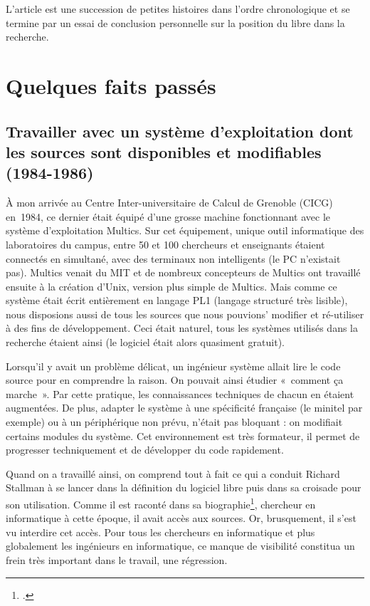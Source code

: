 \documentclass{FramateX}
\begin{document}
\begin{refsection}
L'article est une succession de petites histoires dans l'ordre
chronologique et se termine par un essai de conclusion personnelle sur
la position du libre dans la recherche.


\section*{Quelques faits passés}
{}

\subsection*{Travailler avec un système d'exploitation dont les sources sont disponibles et modifiables (1984-1986)}
{}

À mon arrivée au Centre Inter-universitaire de Calcul de Grenoble (CICG)
en~1984, ce dernier était équipé d'une grosse machine fonctionnant avec
le système d'exploitation Multics. Sur cet équipement, unique outil
informatique des laboratoires du campus, entre 50 et 100 chercheurs et
enseignants étaient connectés en simultané, avec des terminaux non
intelligents (le PC n'existait pas). Multics venait du MIT et de
nombreux concepteurs de Multics ont travaillé ensuite à la création
d'Unix, version plus simple de Multics. Mais comme ce système était
écrit entièrement en langage PL1 (langage structuré très lisible), nous
disposions aussi de tous les sources que nous pouvions' modifier et
ré-utiliser à des fins de développement. Ceci était naturel, tous les
systèmes utilisés dans la recherche étaient ainsi (le logiciel était
alors quasiment gratuit).

Lorsqu'il y avait un problème délicat, un ingénieur système allait lire
le code source pour en comprendre la raison. On pouvait ainsi étudier
«~comment ça marche~». Par cette pratique, les connaissances
techniques de chacun en étaient augmentées. De plus, adapter le système
à une spécificité française (le minitel par exemple) ou à un
périphérique non prévu, n'était pas bloquant : on modifiait certains
modules du système. Cet environnement est très formateur, il permet de
progresser techniquement et de développer du code rapidement.

Quand on a travaillé ainsi, on comprend tout à fait ce qui a conduit
Richard Stallman à se lancer dans la définition du logiciel libre puis
dans sa croisade pour son utilisation. Comme il est raconté dans sa
biographie\footnote{\cite{williamsrichard2010}.}, chercheur en
informatique à cette époque, il avait accès aux sources. Or,
brusquement, il s'est vu interdire cet accès. Pour tous les chercheurs
en informatique et plus globalement les ingénieurs en informatique, ce
manque de visibilité constitua un frein très important dans le travail,
une régression.



\end{refsection}
\end{document}
